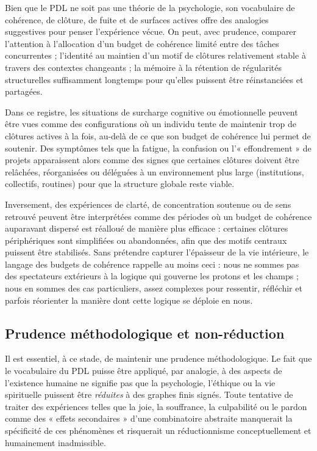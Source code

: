 \documentclass[11pt,a4paper]{article}
\theoremstyle{definition}
\begin{document}
Bien que le PDL ne soit pas une théorie de la psychologie, son vocabulaire de cohérence, de clôture, de fuite et de surfaces actives offre des analogies suggestives pour penser l’expérience vécue.\cite{Laubscher_Existence_PulsatingClosure_2026} On peut, avec prudence, comparer l’attention à l’allocation d’un budget de cohérence limité entre des tâches concurrentes ; l’identité au maintien d’un motif de clôtures relativement stable à travers des contextes changeants ; la mémoire à la rétention de régularités structurelles suffisamment longtemps pour qu’elles puissent être réinstanciées et partagées.

Dans ce registre, les situations de surcharge cognitive ou émotionnelle peuvent être vues comme des configurations où un individu tente de maintenir trop de clôtures actives à la fois, au-delà de ce que son budget de cohérence lui permet de soutenir. Des symptômes tels que la fatigue, la confusion ou l’« effondrement » de projets apparaissent alors comme des signes que certaines clôtures doivent être relâchées, réorganisées ou déléguées à un environnement plus large (institutions, collectifs, routines) pour que la structure globale reste viable.\cite{Laubscher_Existence_PulsatingClosure_2026,Laubscher_PDL_TO_Dialogue_2024}

Inversement, des expériences de clarté, de concentration soutenue ou de sens retrouvé peuvent être interprétées comme des périodes où un budget de cohérence auparavant dispersé est réalloué de manière plus efficace : certaines clôtures périphériques sont simplifiées ou abandonnées, afin que des motifs centraux puissent être stabilisés.\cite{Laubscher_Existence_PulsatingClosure_2026} Sans prétendre capturer l’épaisseur de la vie intérieure, le langage des budgets de cohérence rappelle au moins ceci : nous ne sommes pas des spectateurs extérieurs à la logique qui gouverne les protons et les champs ; nous en sommes des cas particuliers, assez complexes pour ressentir, réfléchir et parfois réorienter la manière dont cette logique se déploie en nous.

\subsection{Prudence méthodologique et non-réduction}

Il est essentiel, à ce stade, de maintenir une prudence méthodologique. Le fait que le vocabulaire du PDL puisse être appliqué, par analogie, à des aspects de l’existence humaine ne signifie pas que la psychologie, l’éthique ou la vie spirituelle puissent être \emph{réduites} à des graphes finis signés.\cite{Laubscher_Existence_PulsatingClosure_2026,Laubscher_PDL_TO_Dialogue_2024} Toute tentative de traiter des expériences telles que la joie, la souffrance, la culpabilité ou le pardon comme des « effets secondaires » d’une combinatoire abstraite manquerait la spécificité de ces phénomènes et risquerait un réductionnisme conceptuellement et humainement inadmissible.
\end{document}
